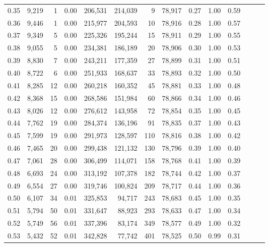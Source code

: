 \begin{tabular}{rrrrrrrrrrrrrr}
0.35 &  9,219 &      1 &  0.00 &  206,531 &  214,039 &       9 &  78,917 &  0.27 &  1.00 &      0.59 \\
0.36 &  9,446 &      1 &  0.00 &  215,977 &  204,593 &      10 &  78,916 &  0.28 &  1.00 &      0.57 \\
0.37 &  9,349 &      5 &  0.00 &  225,326 &  195,244 &      15 &  78,911 &  0.29 &  1.00 &      0.55 \\
0.38 &  9,055 &      5 &  0.00 &  234,381 &  186,189 &      20 &  78,906 &  0.30 &  1.00 &      0.53 \\
0.39 &  8,830 &      7 &  0.00 &  243,211 &  177,359 &      27 &  78,899 &  0.31 &  1.00 &      0.51 \\
0.40 &  8,722 &      6 &  0.00 &  251,933 &  168,637 &      33 &  78,893 &  0.32 &  1.00 &      0.50 \\
0.41 &  8,285 &     12 &  0.00 &  260,218 &  160,352 &      45 &  78,881 &  0.33 &  1.00 &      0.48 \\
0.42 &  8,368 &     15 &  0.00 &  268,586 &  151,984 &      60 &  78,866 &  0.34 &  1.00 &      0.46 \\
0.43 &  8,026 &     12 &  0.00 &  276,612 &  143,958 &      72 &  78,854 &  0.35 &  1.00 &      0.45 \\
0.44 &  7,762 &     19 &  0.00 &  284,374 &  136,196 &      91 &  78,835 &  0.37 &  1.00 &      0.43 \\
0.45 &  7,599 &     19 &  0.00 &  291,973 &  128,597 &     110 &  78,816 &  0.38 &  1.00 &      0.42 \\
0.46 &  7,465 &     20 &  0.00 &  299,438 &  121,132 &     130 &  78,796 &  0.39 &  1.00 &      0.40 \\
0.47 &  7,061 &     28 &  0.00 &  306,499 &  114,071 &     158 &  78,768 &  0.41 &  1.00 &      0.39 \\
0.48 &  6,693 &     24 &  0.00 &  313,192 &  107,378 &     182 &  78,744 &  0.42 &  1.00 &      0.37 \\
0.49 &  6,554 &     27 &  0.00 &  319,746 &  100,824 &     209 &  78,717 &  0.44 &  1.00 &      0.36 \\
0.50 &  6,107 &     34 &  0.01 &  325,853 &   94,717 &     243 &  78,683 &  0.45 &  1.00 &      0.35 \\
0.51 &  5,794 &     50 &  0.01 &  331,647 &   88,923 &     293 &  78,633 &  0.47 &  1.00 &      0.34 \\
0.52 &  5,749 &     56 &  0.01 &  337,396 &   83,174 &     349 &  78,577 &  0.49 &  1.00 &      0.32 \\
0.53 &  5,432 &     52 &  0.01 &  342,828 &   77,742 &     401 &  78,525 &  0.50 &  0.99 &      0.31 \\

\end{tabular}
